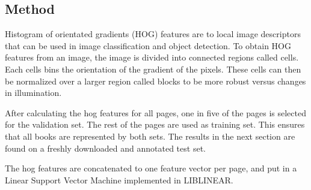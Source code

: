 \subsection{Method}
\label{subsec:pageclasmethod}
Histogram of orientated gradients (HOG) features are
to local image descriptors that can be used in image classification and object
detection\cite{dalal2005histograms}. To obtain HOG features from an image, the
image is divided into connected regions called cells. Each cells bins the
orientation of the gradient of the pixels. These cells can then be normalized
over a larger region called blocks to be more robust versus changes in
illumination.


After calculating the hog features for all pages, one in five of the pages is
selected for the validation set. The rest of the pages are used as training set.
This ensures that all books are represented by both sets. The results in the
next section are found on a freshly downloaded and annotated test set.

The hog features are concatenated to one feature vector per page, and put in a
Linear Support Vector Machine\cite{boser1992training} implemented in 
LIBLINEAR\cite{fan2008liblinear}. 

